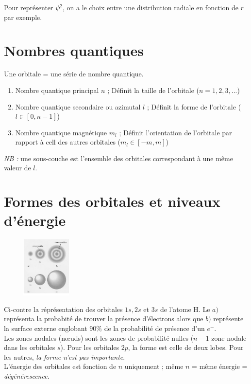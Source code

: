 \documentclass[british,french,11pt, a4paper, openany]{book}
\begin{document}
Pour représenter $\psi^2$, on a le choix entre une distribution radiale en fonction de $r$ par exemple.

\section{Nombres quantiques}
Une orbitale = une série de nombre quantique.
\begin{enumerate}
	\item Nombre quantique principal $n$ ; Définit la taille de l'orbitale ($n = 1, 2, 3, ...$)
	\item Nombre quantique secondaire ou azimutal $l$ ; Définit la forme de l'orbitale ($l \in [0, n-1]$)
	\item Nombre quantique magnétique $m_l$ ; Définit l'orientation de l'orbitale par rapport à cell des autres orbitales ($m_l \in [-m, m]$)
\end{enumerate}
\textit{NB  :} une sous-couche est l'ensemble des orbitales correspondant à une même valeur de $l$.

\section{Formes des orbitales et niveaux d'énergie}
\begin{figure}
	\includegraphics[width=2.5cm]{image5.png}
\end{figure}
Ci-contre la réprésentation des orbitales $1s, 2s$ et $3s$ de l'atome H. Le $a)$ représenta la probabité de trouver la présence d'électrons alors que $b)$ représente la surface externe englobant $90\%$ de la probabilité de présence d'un $e^-$.\\
Les zones nodales (nœuds) sont les zones de probabilité nulles ($n-1$ zone nodale dans les orbitales $s$).
Pour les orbitales $2p$, la forme est celle de deux lobes. Pour les autres, \textit{la forme n'est pas importante}.\\
L'énergie des orbitales est fonction de $n$ uniquement ; même $n$ = même énergie = \textit{dégénérescence}.
\end{document}
